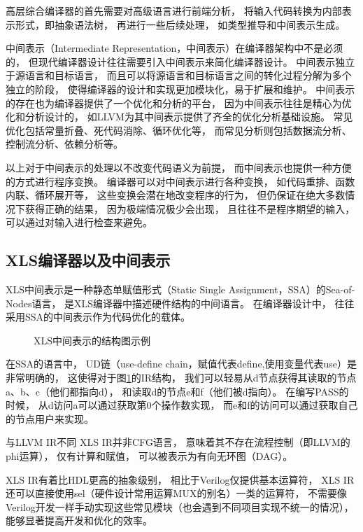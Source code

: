 高层综合编译器的首先需要对高级语言进行前端分析，
将输入代码转换为内部表示形式，即抽象语法树，
再进行一些后续处理，
如类型推导和中间表示生成。

中间表示（Intermediate Representation，中间表示）在编译器架构中不是必须的，
但现代编译器设计往往需要引入中间表示来简化编译器设计。
中间表示独立于源语言和目标语言，
而且可以将源语言和目标语言之间的转化过程分解为多个独立的阶段，
使得编译器的设计和实现更加模块化，易于扩展和维护。
中间表示的存在也为编译器提供了一个优化和分析的平台，
因为中间表示往往是精心为优化和分析设计的，
如LLVM为其中间表示提供了齐全的优化分析基础设施。
常见优化包括常量折叠、死代码消除、循环优化等，
而常见分析则包括数据流分析、控制流分析、依赖分析等。

以上对于中间表示的处理以不改变代码语义为前提，
而中间表示也提供一种方便的方式进行程序变换。
编译器可以对中间表示进行各种变换，
如代码重排、函数内联、循环展开等，
这些变换会潜在地改变程序的行为，
但仍保证在绝大多数情况下获得正确的结果，
因为极端情况极少会出现，
且往往不是程序期望的输入，
可以通过对输入进行检查来避免。

\subsection{XLS编译器以及中间表示}

XLS中间表示是一种静态单赋值形式（Static Single Assignment，SSA）的Sea-of-Nodes语言，
是XLS编译器中描述硬件结构的中间语言。
在编译器设计中，
往往采用SSA的中间表示作为代码优化的载体。

\begin{figure}[h]
\centering

\caption{XLS中间表示的结构图示例}
\label{fig.3}
\end{figure}

在SSA的语言中，
UD链（use-define chain，赋值代表define,使用变量代表use）是非常明确的，
这使得对于图\ref{fig.3}的IR结构，
我们可以轻易从d节点获得其读取的节点a、b、c（他们都指向d），
和读取d的节点e和f（他们被d指向）。
在编写PASS的时候，
从d访问a可以通过获取第0个操作数实现，
而e和f的访问可以通过获取自己的节点用户来实现。

与LLVM IR不同
XLS IR并非CFG语言，
意味着其不存在流程控制（即LLVM的phi运算），
仅有计算和赋值，
可以被表示为有向无环图（DAG）。

XLS IR有着比HDL更高的抽象级别，
相比于Verilog仅提供基本运算符，
XLS IR还可以直接使用sel（硬件设计常用运算MUX的别名）一类的运算符，
不需要像Verilog开发一样手动实现这些常见模块（也会遇到不同项目实现不统一的情况），
能够显著提高开发和优化的效率。

